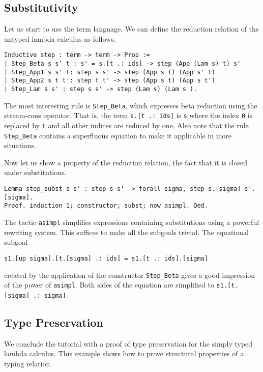\documentclass{scrartcl}
\newcommand{\lst}{\lstinline}
\begin{document}
\subsection*{Substitutivity}
\label{sec:substitutivity}

Let us start to use the term language.
We can define the reduction relation of the untyped lambda calculus as follows.
\begin{lstlisting}
Inductive step : term -> term -> Prop :=
| Step_Beta s s' t : s' = s.[t .: ids] -> step (App (Lam s) t) s'
| Step_App1 s s' t: step s s' -> step (App s t) (App s' t)
| Step_App2 s t t': step t t' -> step (App s t) (App s t')
| Step_Lam s s' : step s s' -> step (Lam s) (Lam s').
\end{lstlisting}
The most interesting rule is \lst$Step_Beta$, which expresses beta reduction using the stream-cons operator.
That is, the term \lst$s.[t .: ids]$ is \lst$s$ where the index \lst$0$ is replaced by \lst$t$ and all other indices are reduced by one.
Also note that the rule \lst$Step_Beta$ contains a superfluous equation to make it applicable in more situations.


Now let us show a property of the reduction relation, the fact that it is closed under substitutions.
\begin{lstlisting}
Lemma step_subst s s' : step s s' -> forall sigma, step s.[sigma] s'.[sigma].
Proof. induction 1; constructor; subst; now asimpl. Qed.
\end{lstlisting}
The tactic \lst$asimpl$ simplifies expressions containing substitutions using a powerful rewriting system. This suffices to make all the subgoals trivial. The equational subgoal 
\begin{center}
\lst$s1.[up sigma].[t.[sigma] .: ids] = s1.[t .: ids].[sigma]$
\end{center}
created by the application of the constructor \lst$Step_Beta$ gives a good impression of the power of \lst$asimpl$. Both sides of the equation are simplified to \lst$s1.[t.[sigma] .: sigma]$.

\subsection*{Type Preservation}
\label{sec:preservation}

We conclude the tutorial with a proof of type preservation for the simply typed lambda calculus. This example shows how to prove structural properties of a typing relation.
\end{document}
